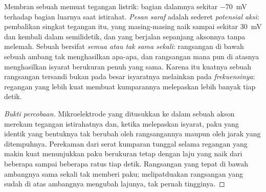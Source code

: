 \begin{proposition}\label{prop:g12:stretch-reflex:actionpotential}
Membran sebuah  memuat tegangan listrik: bagian dalamnya sekitar
\qty{-70}{mV} terhadap bagian luarnya saat istirahat. \emph{Pesan
saraf} adalah sederet \emph{potensial
aksi}: pembalikan singkat tegangan itu, yang
masing-masing naik sampai sekitar \qty{+30}{mV} dan kembali dalam
semilidetik, dan yang berjalan sepanjang aksonnya tanpa melemah.
Sebuah  bersifat \emph{semua atau tak sama sekali}:
rangsangan di bawah sebuah ambang tak menghasilkan apa-apa, dan
rangsangan mana pun di atasnya menghasilkan isyarat berukuran penuh
yang sama. Karena itu kuatnya sebuah rangsangan tersandi bukan pada
besar isyaratnya melainkan pada \emph{frekuensinya}: regangan yang
lebih kuat membuat kumparannya melepaskan lebih banyak 
tiap detik.
\end{proposition}
\begin{proof}[Bukti percobaan]
Mikroelektrode yang ditusukkan ke dalam sebuah akson merekam tegangan
istirahatnya dan, ketika  melepaskan isyarat, paku yang identik
yang bentuknya tak berubah oleh rangsangannya maupun oleh jarak yang
ditempuhnya. Perekaman dari serat kumparan tunggal selama regangan yang
makin kuat menunjukkan paku berukuran tetap dengan laju yang naik dari
beberapa sampai beberapa ratus tiap detik. Rangsangan yang tepat di
bawah ambangnya sama sekali tak memberi paku; melipatduakan rangsangan
yang sudah di atas ambangnya mengubah lajunya, tak pernah tingginya.
\end{proof}

